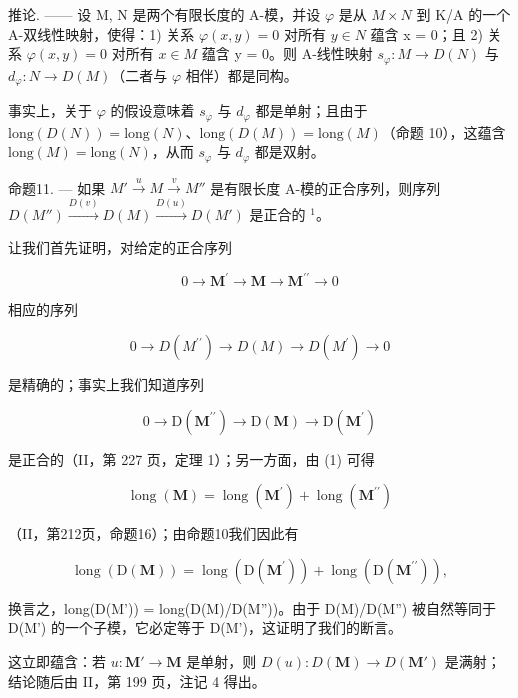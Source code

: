 推论. —— 设 M, N 是两个有限长度的 A-模，并设 \(\varphi\) 是从 \(M \times N\) 到 K/A 的一个 A-双线性映射，使得：1) 关系 \(\varphi(x, y) = 0\) 对所有 \(y \in N\) 蕴含 x = 0；且 2) 关系 \(\varphi(x, y) = 0\) 对所有 \(x \in M\) 蕴含 y = 0。则 A-线性映射 \(s_{\varphi}: M \to D(N)\) 与 \(d_{\varphi}: N \to D(M)\)（二者与 \(\varphi\) 相伴）都是同构。

事实上，关于 \(\varphi\) 的假设意味着 \(s_{\varphi}\) 与 \(d_{\varphi}\) 都是单射；且由于 \(\text{long}(D(N)) = \text{long}(N)\)、\(\text{long}(D(M)) = \text{long}(M)\)（命题 10），这蕴含 \(\text{long}(M) = \text{long}(N)\)，从而 \(s_{\varphi}\) 与 \(d_{\varphi}\) 都是双射。

命题11. --- 如果 \(M' \xrightarrow{u} M \xrightarrow{v} M''\) 是有限长度 A-模的正合序列，则序列 \(D(M'') \xrightarrow{D(v)} D(M) \xrightarrow{D(u)} D(M')\) 是正合的 \(^{1}\)。

让我们首先证明，对给定的正合序列

\[
0 \rightarrow \mathbf {M} ^ {\prime} \rightarrow \mathbf {M} \rightarrow \mathbf {M} ^ {\prime \prime} \rightarrow 0\tag{1}
\]

相应的序列

\[
0 \rightarrow D (M ^ {\prime \prime}) \rightarrow D (M) \rightarrow D (M ^ {\prime}) \rightarrow 0
\]

是精确的；事实上我们知道序列

\[
0 \rightarrow \mathrm{D} (\mathbf {M} ^ {\prime \prime}) \rightarrow \mathrm{D} (\mathbf {M}) \rightarrow \mathrm{D} (\mathbf {M} ^ {\prime})
\]

是正合的（II，第 227 页，定理 1）；另一方面，由 (1) 可得

\[
\operatorname{long} (\mathbf {M}) = \operatorname{long} \left(\mathbf {M} ^ {\prime}\right) + \operatorname{long} \left(\mathbf {M} ^ {\prime \prime}\right)
\]

（II，第212页，命题16）；由命题10我们因此有

\[
\operatorname{long} \left(\mathrm{D} (\mathbf {M})\right) = \operatorname{long} \left(\mathrm{D} \left(\mathbf {M} ^ {\prime}\right)\right) + \operatorname{long} \left(\mathrm{D} \left(\mathbf {M} ^ {\prime \prime}\right)\right),
\]

换言之，long(D(M')) = long(D(M)/D(M''))。由于 D(M)/D(M'') 被自然等同于 D(M') 的一个子模，它必定等于 D(M')，这证明了我们的断言。

这立即蕴含：若 \(u: \mathbf{M}' \to \mathbf{M}\) 是单射，则 \(D(u): D(\mathbf{M}) \to D(\mathbf{M}')\) 是满射；结论随后由 II，第 199 页，注记 4 得出。

